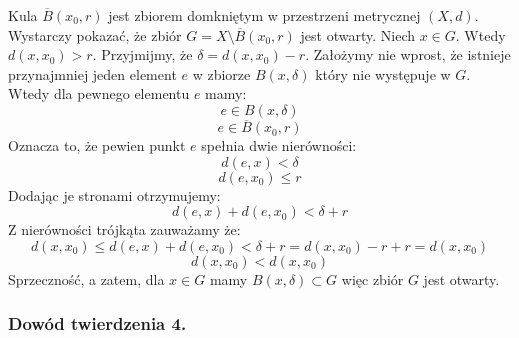 \documentclass{article}
\begin{document}
Kula \(\overline{B}(x_0 , r)\) jest zbiorem domkniętym w przestrzeni metrycznej \((X, d)\).
Wystarczy pokazać, że zbiór \(G = X \setminus \overline{B}(x_0 , r)\)
jest otwarty. Niech \(x \in G\). Wtedy \(d(x, x_0) > r\). Przyjmijmy, że \(\delta = d(x, x_0) - r\). 
Założymy nie wprost, że istnieje przynajmniej jeden element \(e\)
w zbiorze \(B(x, \delta)\) który nie występuje w \(G\). Wtedy dla pewnego elementu \(e\) mamy:
\begin{equation*}
    e \in B(x , \delta)
\end{equation*}
\begin{equation*}
    e \in \overline{B}(x_0 , r)
\end{equation*}
Oznacza to, że pewien punkt \(e\) spełnia dwie nierówności:
\begin{equation*}
    d(e, x) < \delta
\end{equation*}
\begin{equation*}
    d(e, x_0) \leq r 
\end{equation*}
Dodając je stronami otrzymujemy:
\begin{equation*}
    d(e, x) + d(e, x_0) < \delta + r
\end{equation*}
Z nierówności trójkąta zauważamy że:
\begin{equation*}
    d(x, x_0) \leq d(e, x) + d(e, x_0) < \delta + r = d(x, x_0) - r + r = d(x, x_0)
\end{equation*}
\begin{equation*}
    d(x, x_0) < d(x, x_0)
\end{equation*}
Sprzeczność, a zatem, dla \(x \in G\) mamy \(B(x, \delta) \subset G\) więc zbiór \(G\) jest otwarty.

\subsubsection{Dowód twierdzenia 4.}
\end{document}
